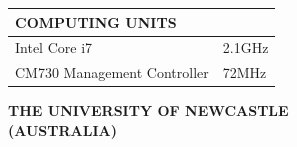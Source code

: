 \documentclass[10pt,a4paper]{article}
\begin{document}
\begin{multicols}{2}
\begin{table}[H]
	\begin{tabular}{|m{5.75cm}|m{1.15cm}|}
		\hline
		\rowcolor[rgb]{0.0, 0.0, 0.0}
		{\color{textcolour}\textbf{{COMPUTING UNITS}}} & \\
		\hline
		Intel Core i7 & 2.1GHz \\
		\hline
		CM730 Management Controller & 72MHz \\
		\hline
	\end{tabular}
\end{table}

\columnbreak

\begin{center}
	\colorbox[rgb]{0.0, 0.0, 0.0}
	{
	\begin{minipage}[c][3.5em][c]{0.45\textwidth}
		\begin{center}
			{\color{textcolour}
				{
				\textbf{THE UNIVERSITY OF NEWCASTLE \\
				(AUSTRALIA)}
				}
			}
		\end{center}
	\end{minipage}
	}
\end{center}


\end{multicols}
\end{document}
